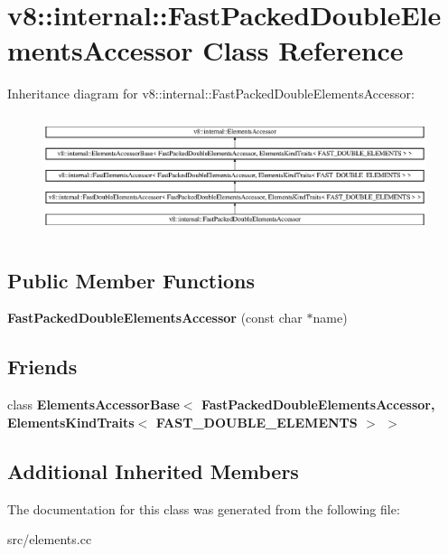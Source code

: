 \hypertarget{classv8_1_1internal_1_1_fast_packed_double_elements_accessor}{}\section{v8\+:\+:internal\+:\+:Fast\+Packed\+Double\+Elements\+Accessor Class Reference}
\label{classv8_1_1internal_1_1_fast_packed_double_elements_accessor}
Inheritance diagram for v8\+:\+:internal\+:\+:Fast\+Packed\+Double\+Elements\+Accessor\+:\begin{figure}[H]
\begin{center}
\leavevmode
\includegraphics[height=3.539823cm]{classv8_1_1internal_1_1_fast_packed_double_elements_accessor}
\end{center}
\end{figure}
\subsection*{Public Member Functions}
\begin{DoxyCompactItemize}
\item 
\hypertarget{classv8_1_1internal_1_1_fast_packed_double_elements_accessor_a31fbb9038f9b1720d9137332aa2ba7bb}{}{\bfseries Fast\+Packed\+Double\+Elements\+Accessor} (const char $\ast$name)\label{classv8_1_1internal_1_1_fast_packed_double_elements_accessor_a31fbb9038f9b1720d9137332aa2ba7bb}

\end{DoxyCompactItemize}
\subsection*{Friends}
\begin{DoxyCompactItemize}
\item 
\hypertarget{classv8_1_1internal_1_1_fast_packed_double_elements_accessor_a3e6a26e14aac8e76d5d987ed3b666cbe}{}class {\bfseries Elements\+Accessor\+Base$<$ Fast\+Packed\+Double\+Elements\+Accessor, Elements\+Kind\+Traits$<$ F\+A\+S\+T\+\_\+\+D\+O\+U\+B\+L\+E\+\_\+\+E\+L\+E\+M\+E\+N\+T\+S $>$ $>$}\label{classv8_1_1internal_1_1_fast_packed_double_elements_accessor_a3e6a26e14aac8e76d5d987ed3b666cbe}

\end{DoxyCompactItemize}
\subsection*{Additional Inherited Members}


The documentation for this class was generated from the following file\+:\begin{DoxyCompactItemize}
\item 
src/elements.\+cc\end{DoxyCompactItemize}
